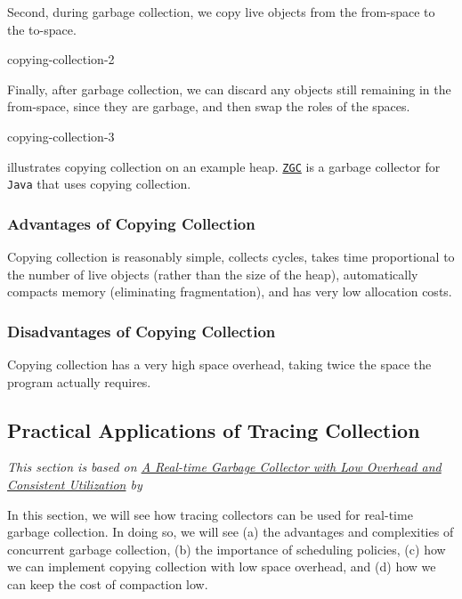Second, during garbage collection, we copy live objects from the from-space to the to-space.

\begin{center}
    {copying-collection-2}
\end{center}

Finally, after garbage collection, we can discard any objects still remaining in the from-space, since they are garbage, and then swap the roles of the spaces.

\begin{center}
    {copying-collection-3}
\end{center}

 illustrates copying collection on an example heap. \href{https://wiki.openjdk.org/display/zgc/Main}{\texttt{ZGC}} is a garbage collector for \texttt{Java} that uses copying collection.

\subsubsection{Advantages of Copying Collection}
Copying collection is reasonably simple, collects cycles, takes time proportional to the number of live objects (rather than the size of the heap), automatically compacts memory (eliminating fragmentation), and has very low allocation costs.

\subsubsection{Disadvantages of Copying Collection}
Copying collection has a very high space overhead, taking twice the space the program actually requires.

\subsection{Practical Applications of Tracing Collection\optional}\label{section:tracing-gc-optional}
\textit{This section is based on \href{https://dl.acm.org/doi/pdf/10.1145/604131.604155}{A Real-time Garbage Collector with Low Overhead and Consistent Utilization} by} \citet{bacon-2003}

In this section, we will see how tracing collectors can be used for real-time garbage collection. In doing so, we will see (a) the advantages and complexities of concurrent garbage collection, (b) the importance of scheduling policies, (c) how we can implement copying collection with low space overhead, and (d) how we can keep the cost of compaction low.

